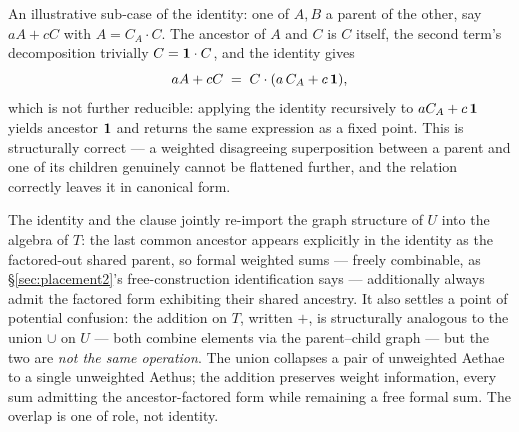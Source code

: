 
An illustrative sub-case of the identity: one of $A, B$ a parent of the other, say $aA + cC$ with $A = C_A \cdot C$. The ancestor of $A$ and $C$ is $C$ itself, the second term's decomposition trivially $C = \mathbf{1} \cdot C$, and the identity gives
\[
aA + cC \;=\; C \cdot (a\, C_A + c\, \mathbf{1}),
\]
which is not further reducible: applying the identity recursively to $a C_A + c\,\mathbf{1}$ yields ancestor $\mathbf{1}$ and returns the same expression as a fixed point. This is structurally correct --- a weighted disagreeing superposition between a parent and one of its children genuinely cannot be flattened further, and the relation correctly leaves it in canonical form.

The identity and the clause jointly re-import the graph structure of $U$ into the algebra of $T$: the last common ancestor appears explicitly in the identity as the factored-out shared parent, so formal weighted sums --- freely combinable, as §\ref{sec:placement2}'s free-construction identification says --- additionally always admit the factored form exhibiting their shared ancestry. It also settles a point of potential confusion: the addition on $T$, written $+$, is structurally analogous to the union $\cup$ on $U$ --- both combine elements via the parent--child graph --- but the two are \emph{not the same operation}. The union collapses a pair of unweighted Aethae to a single unweighted Aethus; the addition preserves weight information, every sum admitting the ancestor-factored form while remaining a free formal sum. The overlap is one of role, not identity.

